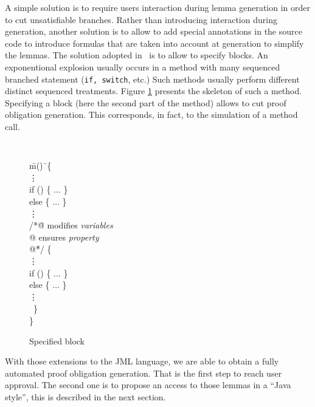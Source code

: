  A simple solution is to require users interaction during lemma
 generation in order to cut unsatisfiable branches.  Rather than introducing
 interaction during generation, another solution is to allow to add
 special annotations in the source code to introduce formulas that are
 taken into account at generation to simplify the lemmas.
 The solution adopted in \JACK\ is to allow to specify blocks. An exponentional explosion usually occurs
in a method with many sequenced branched statement ({\tt if, switch}, etc.) Such methods usually perform
different distinct sequenced treatments.
 Figure \ref{Specified_block} presents the skeleton of such a method. Specifying a block (here the second part
of the method) allows to cut proof obligation generation. This corresponds, in fact, to the simulation of a
method call.
\begin{figure}[htp]
{\tt
\begin{tabbing}
 \hspace{3 cm} \=m()\= \ \{ \\
 \> \> \vdots \\
 \> \> if () \{ $\hdots$ \} \\
 \> \> else \{ $\hdots$ \}   \\
 \> \> \vdots                   \\
 \> \> /*\=@ modifies {\it variables}  \\
 \> \> \> @ ensures {\it property} \\
 \> \> \> @\=*/ \{ \\
 \> \> \> \> \vdots \\
 \> \> \> \> if () \{ $\hdots$ \} \\
 \> \> \> \> else \{ $\hdots$ \}   \\
 \> \> \> \> \vdots                   \\
 \> \> \ \} \\
 \> \> \}
\end{tabbing}
}
 \caption{Specified block}
 \label{Specified_block}
\end{figure}

 With those extensions to the JML language, we are able to obtain a fully automated proof obligation generation.
That is the first step to reach user approval. The second one is to propose an access to those lemmas in a
``Java style'', this is described in the next section.
